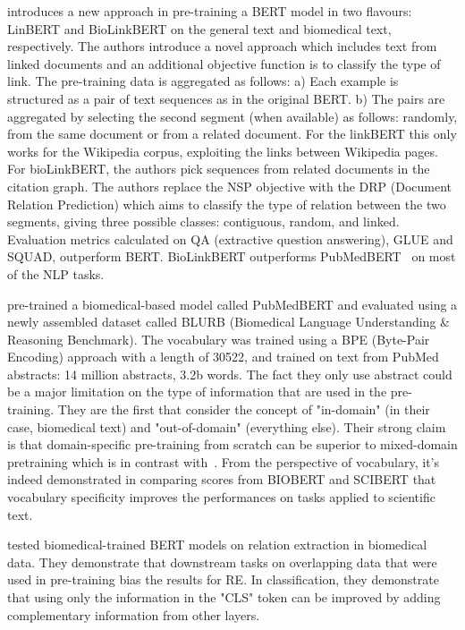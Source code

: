 \cite{yasunaga2020linkbert} introduces a new approach in pre-training a BERT model in two flavours: LinBERT and BioLinkBERT on the general text and biomedical text, respectively.
The authors introduce a novel approach which includes text from linked documents and an additional objective function is to classify the type of link.
The pre-training data is aggregated as follows: a) Each example is structured as a pair of text sequences as in the original BERT. b) The pairs are aggregated by selecting the second segment (when available) as follows: randomly, from the same document or from a related document. For the linkBERT this only works for the Wikipedia corpus, exploiting the links between Wikipedia pages. For bioLinkBERT, the authors pick sequences from related documents in the citation graph. 
The authors replace the NSP objective with the DRP (Document Relation Prediction) which aims to classify the type of relation between the two segments, giving three possible classes: contiguous, random, and linked.  
Evaluation metrics calculated on QA (extractive question answering), GLUE and SQUAD, outperform BERT. BioLinkBERT outperforms PubMedBERT~\cite{gu2020pubmedbert} on most of the NLP tasks. 


\cite{gu2020pubmedbert} pre-trained a biomedical-based model called PubMedBERT and evaluated using a newly assembled dataset called BLURB (Biomedical Language Understanding \& Reasoning Benchmark). 
The vocabulary was trained using a BPE (Byte-Pair Encoding) approach with a length of 30522, and trained on text from PubMed abstracts: 14 million abstracts, 3.2b words. 
The fact they only use abstract could be a major limitation on the type of information that are used in the pre-training. 
They are the first that consider the concept of "in-domain" (in their case, biomedical text) and "out-of-domain" (everything else). 
Their strong claim is that domain-specific pre-training from scratch can be superior to mixed-domain pretraining which is in contrast with~\cite{hong2022ScholarBERT}. 
From the perspective of vocabulary, it's indeed demonstrated in comparing scores from BIOBERT and SCIBERT that vocabulary specificity improves the performances on tasks applied to scientific text. 

\cite{su2022investigation} tested biomedical-trained BERT models on relation extraction in biomedical data. They demonstrate that downstream tasks on overlapping data that were used in pre-training bias the results for RE. In classification, they demonstrate that using only the information in the "CLS" token can be improved by adding complementary information from other layers. 

